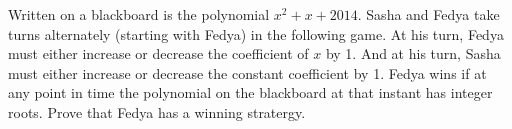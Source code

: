 \problem
Written on a blackboard is the polynomial $x^2 + x + 2014$.
Sasha and Fedya take turns alternately (starting with Fedya) in the following
game.
At his turn, Fedya must either increase or decrease the coefficient of $x$
by 1.
And at his turn, Sasha must either increase or decrease the constant
coefficient by 1.
Fedya wins if at any point in time the polynomial on the blackboard at that
instant has integer roots.
Prove that Fedya has a winning stratergy.
\solution
\endproblem
